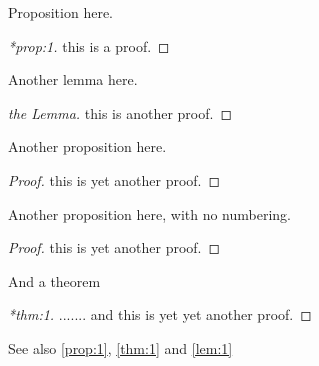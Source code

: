 \documentclass[12pt,a5paper]{article}
\begin{document}
\begin{proposition}
  \label{prop:1}
  Proposition here.
\end{proposition}
\begin{proof}[*prop:1]
  this is a proof.
\end{proof}

\bigskip

\begin{lemma}
\label{lem:1}
Another lemma here.
\end{lemma}
\begin{proof}[the Lemma]
  this is another proof.
\end{proof}

\bigskip

\begin{proposition}
Another proposition here.
\end{proposition}
\begin{proof}
  this is yet another proof.
\end{proof}

\bigskip

\begin{proposition*}
Another proposition here, with no numbering.
\end{proposition*}
\begin{proof}
  this is yet another proof.
\end{proof}

\bigskip

\begin{theorem}
\label{thm:1}
And a theorem
\end{theorem}
\begin{proof}[*thm:1]
  ....... and  this is yet yet another proof.
\end{proof}

\bigskip

See also \autoref{prop:1}, \autoref{thm:1} and \autoref{lem:1}
\end{document}
